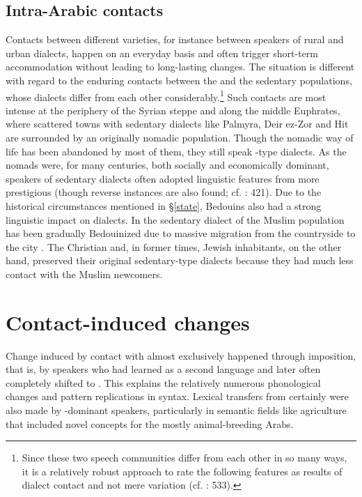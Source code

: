 \documentclass[output=paper]{langsci/langscibook}
\begin{document}
  \subsection{Intra-Arabic contacts} 

Contacts between different  varieties, for instance between speakers of rural and urban dialects, happen on an everyday basis and often trigger short-term {accommodation} without leading to long-lasting changes. The situation is different with regard to the enduring contacts between the  and the sedentary populations, whose dialects differ from each other considerably.\footnote{Since these two speech communities differ from each other in so many ways, it is a relatively robust approach to rate the following features as results of {dialect contact} and not mere variation (cf. \citealt{Lucas2015}: 533).} Such contacts are most intense at the periphery of the Syrian steppe and along the middle Euphrates, where scattered towns with sedentary dialects like Palmyra, Deir ez-Zor and Hit are surrounded by an originally nomadic population. Though the nomadic way of life has been abandoned by most of them, they still speak -type  dialects. As the nomads were, for many centuries, both socially and economically dominant, speakers of sedentary dialects often adopted linguistic features from more {prestigious}  (though reverse instances are also found; cf. \citealt{Behnstedt1994Dialektkontakt}: 421). Due to the historical circumstances mentioned in §\ref{state}, Bedouins also had a strong linguistic impact on  dialects. In  the sedentary dialect of the Muslim population has been gradually Bedouinized due to massive migration from the countryside to the city \citep{Palva2009}. The Christian and, in former times, Jewish inhabitants, on the other hand, preserved their original sedentary-type dialects because they had much less contact with the Muslim newcomers. 

\section{Contact-induced changes}\largerpage

Change induced by contact with  almost exclusively happened through {imposition}, that is, by  speakers who had learned  as a second language and later often completely shifted to . This explains the relatively numerous phonological changes and pattern replications in syntax. Lexical transfers from  certainly were also made by -dominant speakers, particularly in semantic fields like agriculture that included novel concepts for the mostly animal-breeding Arabs.
\end{document}
